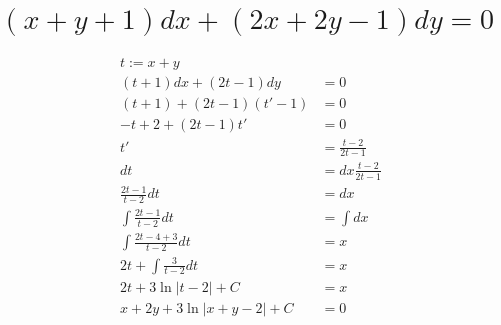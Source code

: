 
\section{$(x+y+1)dx+(2x+2y-1)dy=0$}

\begin{align*}
    t := x + y                                                 \\
    (t + 1)dx + (2t - 1)dy          & = 0                      \\
    (t + 1) + (2t - 1)(t' - 1)      & = 0                      \\
    -t + 2 + (2t - 1)t'             & = 0                      \\
    t'                              & = \frac{t - 2}{2t - 1}   \\
    dt                              & = dx\frac{t - 2}{2t - 1} \\
    \frac{2t - 1}{t - 2}dt          & = dx                     \\
    \int \frac{2t - 1}{t - 2}dt     & = \int dx                \\
    \int \frac{2t - 4 + 3}{t - 2}dt & = x                      \\
    2t + \int \frac{3}{t - 2}dt     & = x                      \\
    2t + 3\ln|t - 2| + C            & = x                      \\
    x + 2y + 3\ln|x + y - 2| + C    & = 0                      \\
\end{align*}

